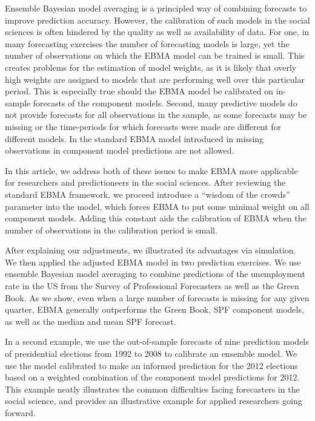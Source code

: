 \documentclass[12pt,fullpage,endnotes]{article}
\begin{document}
Ensemble Bayesian model averaging is a principled way of combining
forecasts to improve prediction accuracy. However, the calibration of
such models in the social sciences is often hindered by the quality as
well as availability of data. For one, in many forecasting exercises
the number of forecasting models is large, yet the number of
observations on which the EBMA model can be trained is small. This
creates problems for the estimation of model weights, as it is likely
that overly high weights are assigned to models that are performing
well over this particular period. This is especially true should the
EBMA model be calibrated on in-sample forecasts of the component
models. Second, many predictive models do not provide forecasts for
all observations in the sample, as some forecasts may be missing or
the time-periods for which forecasts were made are different for
different models. In the standard EBMA model introduced in
\citet{mhw:2012} missing observations in component model predictions
are not allowed.

In this article, we address both of these issues to make EBMA more
applicable for researchers and predictioneers in the social
sciences. After reviewing the standard EBMA framework, we proceed
introduce a ``wisdom of the crowds'' parameter into the model, which
forces EBMA to put some minimal weight on all component models. Adding
this constant aids the calibration of EBMA when the number of
observations in the calibration period is small.

After explaining our adjustments, we illustrated its advantages via
simulation.  We then applied the adjusted EBMA model in two prediction
exercises. We use ensemble Bayesian model averaging to combine
predictions of the unemployment rate in the US from the Survey of
Professional Forecasters as well as the Green Book. As we show, even
when a large number of forecasts is missing for any given quarter,
EBMA generally outperforms the Green Book, SPF component models, as
well as the median and mean SPF forecast.

In a second example, we use the out-of-sample forecasts of nine
prediction models of presidential elections from 1992 to 2008 to
calibrate an ensemble model. We use the model calibrated to make an
informed prediction for the 2012 elections based on a weighted
combination of the component model predictions for 2012. This example
neatly illustrates the common difficulties facing forecasters in the
social science, and provides an illustrative example for applied
researchers going forward.
\end{document}
